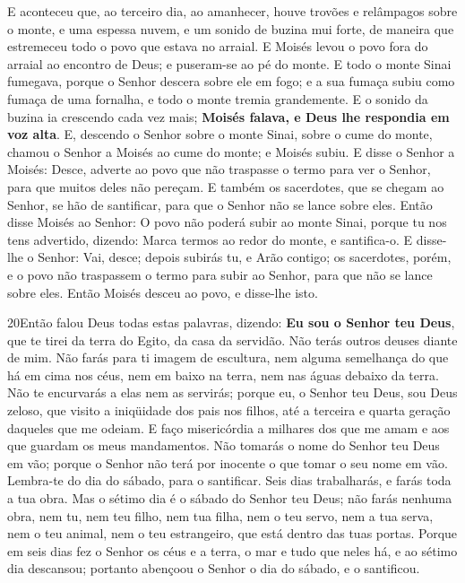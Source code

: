 E aconteceu que, ao terceiro dia, ao amanhecer, houve trovões e
relâmpagos sobre o monte, e uma espessa nuvem, e um sonido de buzina
mui forte, de maneira que estremeceu todo o povo que estava no
arraial. E Moisés levou o povo fora do arraial ao encontro de
Deus; e puseram-se ao pé do monte. E todo o monte Sinai
fumegava, porque o Senhor descera sobre ele em fogo; e a sua fumaça
subiu como fumaça de uma fornalha, e todo o monte tremia
grandemente. E o sonido da buzina ia crescendo cada vez mais;
\textbf{Moisés falava, e Deus lhe respondia em voz alta}. E,
descendo o Senhor sobre o monte Sinai, sobre o cume do monte, chamou
o Senhor a Moisés ao cume do monte; e Moisés subiu. E disse o
Senhor a Moisés: Desce, adverte ao povo que não traspasse o termo
para ver o Senhor, para que muitos deles não pereçam. E
também os sacerdotes, que se chegam ao Senhor, se hão de santificar,
para que o Senhor não se lance sobre eles. Então disse Moisés
ao Senhor: O povo não poderá subir ao monte Sinai, porque tu nos
tens advertido, dizendo: Marca termos ao redor do monte, e
santifica-o. E disse-lhe o Senhor: Vai, desce; depois subirás
tu, e Arão contigo; os sacerdotes, porém, e o povo não traspassem o
termo para subir ao Senhor, para que não se lance sobre eles.
Então Moisés desceu ao povo, e disse-lhe isto.

\medskip

\lettrine{20} Então falou Deus todas estas palavras, dizendo:
\textbf{Eu sou o Senhor teu Deus}, que te tirei da terra do
Egito, da casa da servidão. Não terás outros deuses diante de
mim. Não farás para ti imagem de escultura, nem alguma
semelhança do que há em cima nos céus, nem em baixo na terra, nem
nas águas debaixo da terra. Não te encurvarás a elas nem as
servirás; porque eu, o Senhor teu Deus, sou Deus zeloso, que visito
a iniqüidade dos pais nos filhos, até a terceira e quarta geração
daqueles que me odeiam. E faço misericórdia a milhares dos que
me amam e aos que guardam os meus mandamentos. Não tomarás o
nome do Senhor teu Deus em vão; porque o Senhor não terá por
inocente o que tomar o seu nome em vão. Lembra-te do dia do
sábado, para o santificar. Seis dias trabalharás, e farás toda a
tua obra. Mas o sétimo dia é o sábado do Senhor teu Deus; não
farás nenhuma obra, nem tu, nem teu filho, nem tua filha, nem o teu
servo, nem a tua serva, nem o teu animal, nem o teu estrangeiro, que
está dentro das tuas portas. Porque em seis dias fez o Senhor
os céus e a terra, o mar e tudo que neles há, e ao sétimo dia
descansou; portanto abençoou o Senhor o dia do sábado, e o
santificou.

